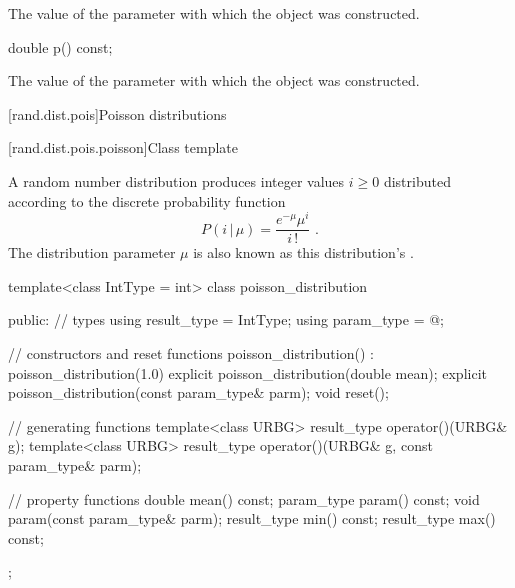 \begin{itemdescr}
\pnum
\returns
The value of the  parameter
 with which the object was constructed.
\end{itemdescr}

%
\begin{itemdecl}
double p() const;
\end{itemdecl}

\begin{itemdescr}
\pnum
\returns
The value of the  parameter
 with which the object was constructed.
\end{itemdescr}%
%
%



[rand.dist.pois]{Poisson distributions}%
%
%


[rand.dist.pois.poisson]{Class template }%
%
%

\pnum
A  random number distribution
produces integer values $i \geq 0$
distributed according to
the discrete probability function
%
%
\[ P(i\,|\,\mu) = \frac{e^{-\mu} \mu^{i}}{i\,!} \text{ .} \]
The distribution parameter $\mu$
is also known as this distribution's %
%
%
.

%
%
\begin{codeblock}
template<class IntType = int>
  class poisson_distribution
  {
  public:
    // types
    using result_type = IntType;
    using param_type  = @\unspec@;

    // constructors and reset functions
    poisson_distribution() : poisson_distribution(1.0) {}
    explicit poisson_distribution(double mean);
    explicit poisson_distribution(const param_type& parm);
    void reset();

    // generating functions
    template<class URBG>
      result_type operator()(URBG& g);
    template<class URBG>
      result_type operator()(URBG& g, const param_type& parm);

    // property functions
    double mean() const;
    param_type param() const;
    void param(const param_type& parm);
    result_type min() const;
    result_type max() const;
  };
\end{codeblock}

